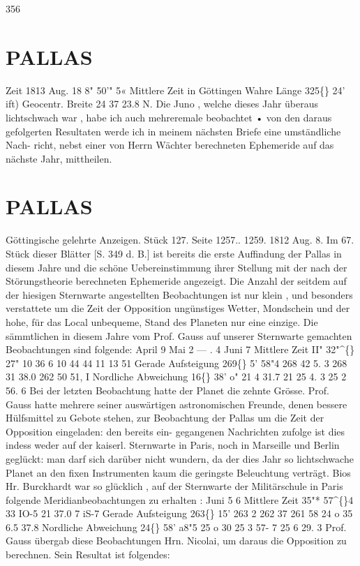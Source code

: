 \documentclass[12pt,a4paper]{article}
\newcommand{\degree}{\textdegree}
\begin{document}
\newpage
356 

\section*{PALLAS}
Zeit  1813  Aug.  18     8"  50'"  5«  Mittlere  Zeit  in  Göttingen 
Wahre  Länge   
325\degree\{\}  24'    ift) 
Geocentr.  Breite   
24    37    23.8  N. 
Die  Juno ,  welche  dieses  Jahr  überaus  lichtschwach  war ,  habe  ich  auch  mehreremale  beobachtet  • 
von  den  daraus  gefolgerten  Resultaten  werde  ich  in  meinem  nächsten  Briefe  eine  umständliche  Nach- 
richt, nebst  einer  von  Herrn  Wächter  berechneten  Ephemeride  auf  das  nächste  Jahr,  mittheilen. 

\section*{PALLAS}
Göttingische  gelehrte  Anzeigen.     Stück  127.  Seite  1257..  1259.     1812  Aug.  8. 
Im  67.  Stück  dieser  Blätter  [S.  349  d.  B.]  ist  bereits  die  erste  Auffindung  der  Pallas  in  diesem 
Jahre  und  die  schöne  Uebereinstimmung  ihrer  Stellung  mit  der  nach  der  Störungstheorie  berechneten 
Ephemeride  angezeigt.  Die  Anzahl  der  seitdem  auf  der  hiesigen  Sternwarte  angestellten  Beobachtungen 
ist  nur  klein ,  und  besonders  verstattete  um  die  Zeit  der  Opposition  ungünstiges  Wetter,  Mondschein  und 
der  hohe,  für  das  Local  unbequeme,  Stand  des  Planeten  nur  eine  einzige.  Die  sämmtlichen  in  diesem 
Jahre  vom  Prof.  Gauss  auf  unserer  Sternwarte  gemachten  Beobachtungen  sind  folgende: 
April  9 
Mai     2 
--- .    4 
Juni    7 
Mittlere  Zeit 
II"  32"\textasciicircum\{\}  27" 
10     36       6 
10  44     44 
11  13     51 
Gerade 
Aufsteigung 
269\degree\{\}     5'  58"4 
268     42  5. 3 
268     31  38.0 
262     50  51, I 
Nordliche 
Abweichung 
16\degree\{\}  38'  o" 
21      4  31.7 
21     25  4. 3 
25       2  56.  6 
Bei  der  letzten  Beobachtung  hatte  der  Planet  die  zehnte  Grösse. 
Prof.  Gauss  hatte  mehrere  seiner  auswärtigen  astronomischen  Freunde,  denen  bessere  Hülfsmittel 
zu  Gebote  stehen,  zur  Beobachtung  der  Pallas  um  die  Zeit  der  Opposition  eingeladen:  den  bereits  ein- 
gegangenen Nachrichten  zufolge  ist  dies  indess  weder  auf  der  kaiserl.  Sternwarte  in  Paris,  noch  in 
Marseille  und  Berlin  geglückt:  man  darf  sich  darüber  nicht  wundern,  da  der  dies  Jahr  so  lichtschwache 
Planet  an  den  fixen  Instrumenten  kaum  die  geringste  Beleuchtung  verträgt.  Bios  Hr.  Burckhardt  war 
so  glücklich ,  auf  der  Sternwarte  der  Militärschule  in  Paris  folgende  Meridianbeobachtungen  zu  erhalten : 
Juni  5 
6 
Mittlere  Zeit 
35"*  57\textasciicircum\{\}4 
33  IO-5 
21     37.0 
7     iS-7 
Gerade 
Aufsteigung 
263\degree\{\}  15' 
263  2 
262  37 
261  58 
24  o 
35 
6.5 
37.8 
Nordliche 
Abweichung 
24\degree\{\}  58'    a8"5 
25       o     30 
25       3     57-  7 
25       6     29. 3 
Prof.  Gauss  übergab  diese  Beobachtungen  Hrn.  Nicolai,  um  daraus  die  Opposition  zu  berechnen. 
Sein  Resultat  ist  folgendes: 
\end{document}
